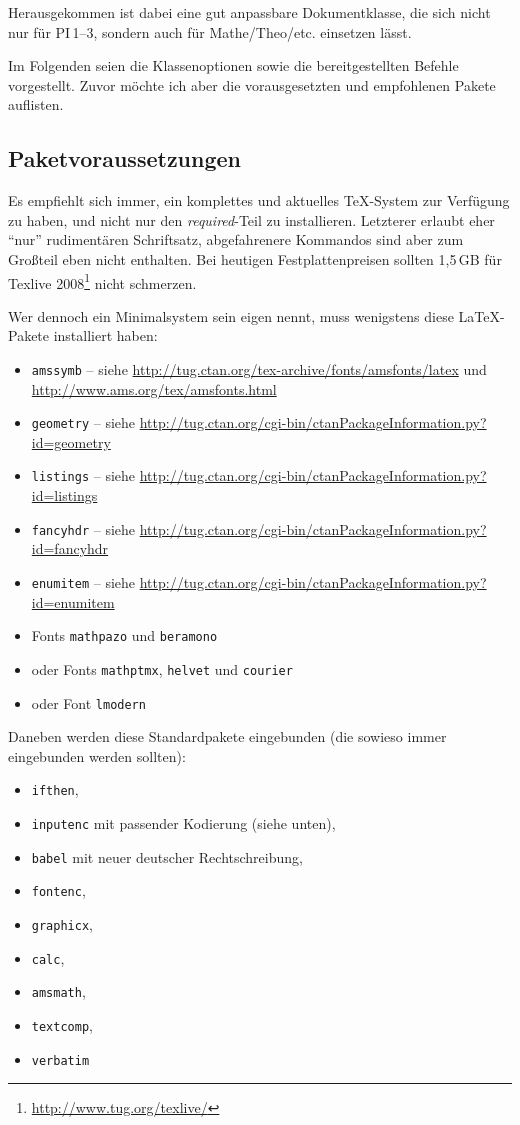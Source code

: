 \documentclass[nicefonts,nogruppe,nosemester,noveranstaltung,notutor,noabgabe,utf]{uhb-inf-tex}
\begin{document}
Herausgekommen ist dabei eine gut anpassbare Dokumentklasse, die sich nicht nur für PI\,1--3, sondern auch für Mathe/Theo/etc. einsetzen lässt.

Im Folgenden seien die Klassenoptionen sowie die bereitgestellten Befehle vorgestellt. Zuvor möchte ich aber die vorausgesetzten und empfohlenen Pakete auflisten.

\subsection{Paketvoraussetzungen}

Es empfiehlt sich immer, ein komplettes und aktuelles \TeX-System zur Verfügung zu haben, und nicht nur den \textit{required}-Teil zu installieren. Letzterer erlaubt eher "`nur"' rudimentären Schriftsatz, abgefahrenere Kommandos sind aber zum Großteil eben nicht enthalten. Bei heutigen Festplattenpreisen sollten 1,5\,GB für Texlive 2008\footnote{\url{http://www.tug.org/texlive/}} nicht schmerzen.

Wer dennoch ein Minimalsystem sein eigen nennt, muss wenigstens diese \LaTeX-Pakete installiert haben:

\begin{itemize}
	\item \texttt{amssymb} -- siehe \url{http://tug.ctan.org/tex-archive/fonts/amsfonts/latex} und \url{http://www.ams.org/tex/amsfonts.html}
	\item \texttt{geometry} -- siehe \url{http://tug.ctan.org/cgi-bin/ctanPackageInformation.py?id=geometry}
	\item \texttt{listings} -- siehe \url{http://tug.ctan.org/cgi-bin/ctanPackageInformation.py?id=listings}
	\item \texttt{fancyhdr} -- siehe \url{http://tug.ctan.org/cgi-bin/ctanPackageInformation.py?id=fancyhdr}
	\item \texttt{enumitem} -- siehe \url{http://tug.ctan.org/cgi-bin/ctanPackageInformation.py?id=enumitem}
	\item Fonts \texttt{mathpazo} und \texttt{beramono}
	\item oder Fonts \texttt{mathptmx}, \texttt{helvet} und \texttt{courier}
	\item oder Font \texttt{lmodern}
\end{itemize}

Daneben werden diese Standardpakete eingebunden (die sowieso immer eingebunden werden sollten):

\begin{itemize}
	\item \texttt{ifthen},
	\item \texttt{inputenc} mit passender Kodierung (siehe unten),
	\item \texttt{babel} mit neuer deutscher Rechtschreibung,
	\item \texttt{fontenc},
	\item \texttt{graphicx},
	\item \texttt{calc},
	\item \texttt{amsmath},
	\item \texttt{textcomp},
	\item \texttt{verbatim}
\end{itemize}
\end{document}
